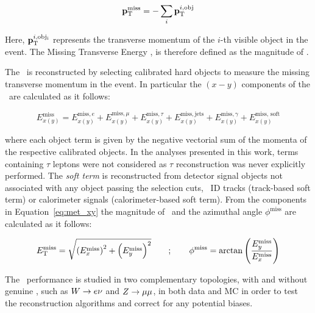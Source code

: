 			\begin{equation}
				\mathbf{p}_\mathrm{T}^\mathrm{miss} = - \sum_i \mathbf{p}_\mathrm{T}^{i, \mathrm{obj}}
				\label{eq:ptmiss}
			\end{equation}

			\noindent Here, $\mathbf{p}_\mathrm{T}^{i, \mathrm{obj_i}}$ represents the transverse momentum of the $i$-th visible object in the event. The Missing Transverse Energy \met, is therefore defined as the magnitude of \ptmiss. 

			The \met\ is reconstructed by selecting calibrated hard objects to measure the missing transverse momentum in the event. In particular the $(x-y)$ components of the \met\ are calculated as it follows: 

			\begin{equation}
				E_{x(y)}^{\mathrm{miss}} = E_{x(y)}^{\mathrm{miss}, e} + E_{x(y)}^{\mathrm{miss}, \mu} + E_{x(y)}^{\mathrm{miss}, \tau} + E_{x(y)}^{\mathrm{miss, jets}} + E_{x(y)}^{\mathrm{miss}, \gamma} + E_{x(y)}^{\mathrm{miss,\,soft}}
				\label{eq:met_xy}
			\end{equation}

			where each object term is given by the negative vectorial sum of the momenta of the respective calibrated objects. In the analyses presented in this work, terms containing $\tau$ leptons were not considered as $\tau$ reconstruction was never explicitly performed. The \emph{soft term} is reconstructed from detector signal objects not associated with any object passing the selection cuts, \eg\ \ac{ID} tracks (track-based soft term) or calorimeter signals (calorimeter-based soft term). From the components in Equation~\ref{eq:met_xy} the magnitude of \met\ and the azimuthal angle $\phi^{\mathrm{miss}}$ are calculated as it follows:

			\begin{eqnarray}
				E_{\mathrm{T}}^{\mathrm{miss}} = \sqrt{ \left(E_{x}^{\mathrm{miss}}\right)^2 + \left(E_{y}^{\mathrm{miss}} \right)^2 } \qquad ; \qquad
				\phi^{\mathrm{miss}} = \arctan \left ( \frac{E_y^{\mathrm{miss}}}{E_x^{\mathrm{miss}}} \right )
			\end{eqnarray}

			The \met\ performance is studied in two complementary topologies, with and without genuine \met, such as $W \rightarrow e\nu$ and $Z \rightarrow \mu\mu$, in both data and \ac{MC} in order to test the reconstruction algorithms and correct for any potential biases. 

			